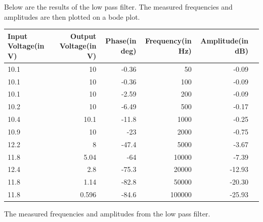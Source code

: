 Below are the results of the low pass filter. The measured frequencies and amplitudes are then plotted on a bode plot.

\begin{adjustwidth}{-2.5 cm}{-2.5 cm}\centering\begin{threeparttable}[!htb]
        \scriptsize
        \begin{tabular}{lrrrrr}\toprule
            \textbf{Input Voltage(in V)} & \textbf{Output Voltage(in V)} & \textbf{Phase(in deg)} & \textbf{Frequency(in Hz)} & \textbf{Amplitude(in dB)} \\\midrule
            10.1                         & 10                            & -0.36                  & 50                        & -0.09                     \\
            10.1                         & 10                            & -0.36                  & 100                       & -0.09                     \\
            10.1                         & 10                            & -2.59                  & 200                       & -0.09                     \\
            10.2                         & 10                            & -6.49                  & 500                       & -0.17                     \\
            10.4                         & 10.1                          & -11.8                  & 1000                      & -0.25                     \\
            10.9                         & 10                            & -23                    & 2000                      & -0.75                     \\
            12.2                         & 8                             & -47.4                  & 5000                      & -3.67                     \\
            11.8                         & 5.04                          & -64                    & 10000                     & -7.39                     \\
            12.4                         & 2.8                           & -75.3                  & 20000                     & -12.93                    \\
            11.8                         & 1.14                          & -82.8                  & 50000                     & -20.30                    \\
            11.8                         & 0.596                         & -84.6                  & 100000                    & -25.93                    \\
            \bottomrule
        \end{tabular}
        \caption{The measured frequencies and amplitudes from the low pass filter.}
    \end{threeparttable}\end{adjustwidth}

